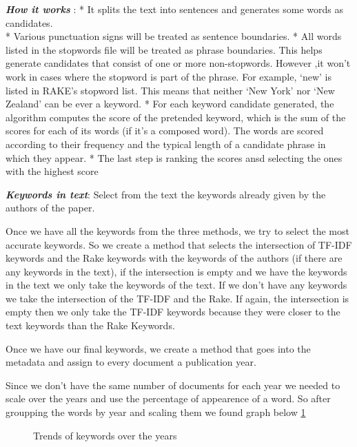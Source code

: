\documentclass[article,twocolumn]{IEEEtran}
\begin{document}
\textbf{\emph{How it works}} : * It splits the text into sentences and
generates some words as candidates.\\
* Various punctuation signs will be treated as sentence boundaries. *
All words listed in the stopwords file will be treated as phrase
boundaries. This helps generate candidates that consist of one or more
non-stopwords. However ,it won't work in cases where the stopword is
part of the phrase. For example, `new' is listed in RAKE's stopword
list. This means that neither `New York' nor `New Zealand' can be ever a
keyword. * For each keyword candidate generated, the algorithm computes
the score of the pretended keyword, which is the sum of the scores for
each of its words (if it's a composed word). The words are scored
according to their frequency and the typical length of a candidate
phrase in which they appear. * The last step is ranking the scores ansd
selecting the ones with the highest score

    \textbf{\emph{Keywords in text}}: Select from the text the keywords
already given by the authors of the paper.

    Once we have all the keywords from the three methods, we try to select
the most accurate keywords. So we create a method that selects the
intersection of TF-IDF keywords and the Rake keywords with the keywords
of the authors (if there are any keywords in the text), if the
intersection is empty and we have the keywords in the text we only take
the keywords of the text. If we don't have any keywords we take the
intersection of the TF-IDF and the Rake. If again, the intersection is
empty then we only take the TF-IDF keywords because they were closer to
the text keywords than the Rake Keywords.

    Once we have our final keywords, we create a method that goes into the
metadata and assign to every document a publication year.


    Since we don't have the same number of documents for each year we needed
to scale over the years and use the percentage of appearence of a word.
So after groupping the words by year and scaling them we found graph
below \ref{fig1}


    \begin{figure}
        \begin{center}\end{center}
        \caption{Trends of keywords over the years}
        \label{fig1}
    \end{figure}
    
\end{document}
